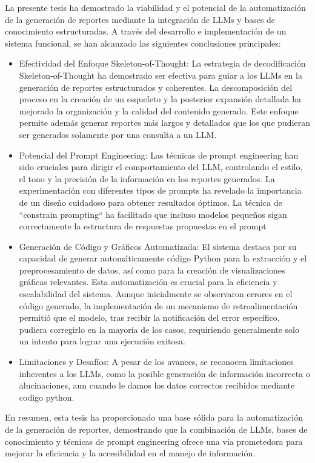 \begin{conclusions}
    La presente tesis ha demostrado la viabilidad y el potencial de la automatización de la generación de reportes mediante la integración de LLMs y bases de conocimiento estructuradas. A través del desarrollo e implementación de un sistema funcional, se han alcanzado las siguientes conclusiones principales:
    \begin{itemize}
    \item{Efectividad del Enfoque Skeleton-of-Thought:} La estrategia de decodificación Skeleton-of-Thought ha demostrado ser efectiva para guiar a los LLMs en la generación de reportes estructurados y coherentes. La descomposición del proceso en la creación de un esqueleto y la posterior expansión detallada ha mejorado la organización y la calidad del contenido generado. Este enfoque permite además generar reportes más largos y detallados que los que pudieran ser generados solamente por una consulta a un LLM.
    
    \item{Potencial del Prompt Engineering:} Las técnicas de prompt engineering han sido cruciales para dirigir el comportamiento del LLM, controlando el estilo, el tono y la precisión de la información en los reportes generados. La experimentación con diferentes tipos de prompts ha revelado la importancia de un diseño cuidadoso para obtener resultados óptimos. La técnica de ``constrain prompting`` ha facilitado que incluso modelos pequeños sigan correctamente la estructura de respuestas propuestas en el prompt
    
	\item{Generación de Código y Gráficos Automatizada:}  El sistema destaca por su capacidad de generar automáticamente código Python para la extracción y el preprocesamiento de datos, así como para la creación de visualizaciones gráficas relevantes. Esta automatización es crucial para la eficiencia y escalabilidad del sistema. Aunque inicialmente se observaron errores en el código generado, la implementación de un mecanismo de retroalimentación permitió que el modelo, tras recibir la notificación del error específico, pudiera corregirlo en la mayoría de los casos, requiriendo generalmente solo un intento para lograr una ejecución exitosa.
    
    \item{Limitaciones y Desafíos:} A pesar de los avances, se reconocen limitaciones inherentes a los LLMs, como la posible generación de información incorrecta o alucinaciones, aun cuando le damos los datos correctos recibidos mediante codigo python.
\end{itemize}
    En resumen, esta tesis ha proporcionado una base sólida para la automatización de la generación de reportes, demostrando que la combinación de LLMs, bases de conocimiento y técnicas de prompt engineering ofrece una vía prometedora para mejorar la eficiencia y la accesibilidad en el manejo de información.
    
\end{conclusions}
